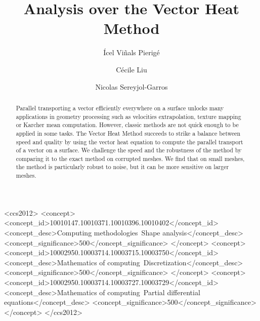 \documentclass[sigconf]{acmart}
\begin{document}
\title{Analysis over the Vector Heat Method}

\author{Ícel Viñals Pierigé}

\author{Cécile Liu}

\author{Nicolas Sereyjol-Garros}


\begin{abstract}
  Parallel transporting a vector efficiently everywhere on a surface unlocks many applications in geometry processing such as velocities extrapolation, texture mapping or Karcher mean computation. However, classic methods are not quick enough to be applied in some tasks. The Vector Heat Method succeeds to strike a balance between speed and quality by using the vector heat equation to compute the parallel transport of a vector on a surface. We challenge the speed and the robustness of the method by comparing it to the exact method on corrupted meshes. We find that on small meshes, the method is particularly robust to noise, but it can be more sensitive on larger meshes.
\end{abstract}

\begin{CCSXML}
<ccs2012>
   <concept>
       <concept_id>10010147.10010371.10010396.10010402</concept_id>
       <concept_desc>Computing methodologies~Shape analysis</concept_desc>
       <concept_significance>500</concept_significance>
       </concept>
   <concept>
       <concept_id>10002950.10003714.10003715.10003750</concept_id>
       <concept_desc>Mathematics of computing~Discretization</concept_desc>
       <concept_significance>500</concept_significance>
       </concept>
   <concept>
       <concept_id>10002950.10003714.10003727.10003729</concept_id>
       <concept_desc>Mathematics of computing~Partial differential equations</concept_desc>
       <concept_significance>500</concept_significance>
       </concept>
 </ccs2012>
\end{CCSXML}
\end{document}
